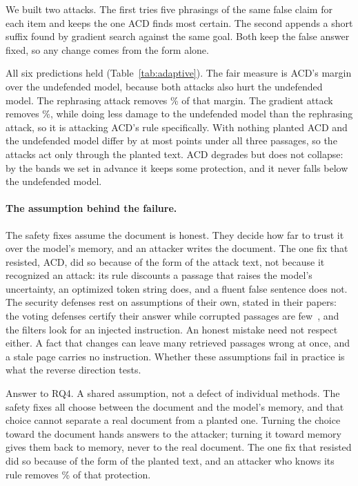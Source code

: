 We built two attacks. The first tries five phrasings of the same false claim
for each item and keeps the one ACD finds most certain. The second appends a
short suffix found by gradient search against the same goal. Both keep the
false answer fixed, so any change comes from the form alone.

All six predictions held (Table~\ref{tab:adaptive}). The fair measure is
ACD's margin over the undefended model, because both attacks also hurt the
undefended model. The rephrasing attack removes \PctAcdRemovedBestOf\% of
that margin. The gradient attack removes \PctAcdRemovedGradient\%, while doing
less damage to the undefended model than the rephrasing attack, so it is
attacking ACD's rule specifically. With nothing planted ACD and the
undefended model differ by at most \NAcdGapCleanMax{} points under all three
passages, so the attacks act only through the planted text. ACD
degrades but does not collapse: by the bands we set in advance it keeps some
protection, and it never falls below the undefended model.

\paragraph{The assumption behind the failure.}
\label{sec:neither}
The safety fixes assume the document is honest. They decide how far to trust
it over the model's memory, and an attacker writes the document. The one fix
that resisted, ACD, did so because of the form of the attack text, not
because it recognized an attack: its rule discounts a passage that raises the
model's uncertainty, an optimized token string does, and a fluent false
sentence does not. The security defenses rest on assumptions of their own,
stated in their papers: the voting defenses certify their answer while
corrupted passages are few~\cite{xiang-2024-certifiably,shen-2025-reliabilityrag},
and the filters look for an injected instruction. An honest mistake need not
respect either. A fact that changes can leave many retrieved passages wrong
at once, and a stale page carries no instruction. Whether these assumptions
fail in practice is what the reverse direction tests.

Answer to RQ4. A shared assumption, not a defect of individual methods. The
safety fixes all choose between the document and the model's memory, and
that choice cannot separate a real document from a planted one. Turning the
choice toward the document hands answers to the attacker; turning it toward
memory gives them back to memory, never to the real document. The one fix
that resisted did so because of the form of the planted text, and an
attacker who knows its rule removes \PctAcdRemovedGradient{}\% of that
protection.

